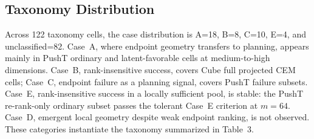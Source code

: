 \subsection{Taxonomy Distribution}
\label{app:stage1b_taxonomy}

Across 122 taxonomy cells, the case distribution is A=18, B=8, C=10, E=4,
and unclassified=82.  Case~A, where endpoint geometry transfers to
planning, appears mainly in PushT ordinary and latent-favorable cells at
medium-to-high dimensions.  Case~B, rank-insensitive success, covers Cube
full projected CEM cells; Case~C, endpoint failure as a planning signal,
covers PushT failure subsets.  Case~E, rank-insensitive success in a
locally sufficient pool, is stable: the PushT re-rank-only ordinary subset
passes the tolerant Case~E criterion at $m=64$.  Case~D, emergent local
geometry despite weak endpoint ranking, is not observed.  These categories
instantiate the taxonomy summarized in Table~3.
